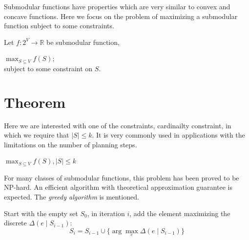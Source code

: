\documentclass[12pt]{article}
\begin{document}
Submodular functions have properties which are very similar to convex and concave functions. Here we focus on the problem of maximizing a submodular function subject to some constraints.

\begin{mydef}

Let $ f : 2^{V} \rightarrow \mathbb{R} $ be submodular function, 

\begin{center}
 $ \max_{S \subseteq V} f(S) $; \\
 subject to some constraint on $ S  $.

\end{center}
\end{mydef}


\section{Theorem}

Here we are interested with one of the constraints, cardinailty constraint, in which we require that $ | S | \leq k $. It is very commonly used in applications with the limitations on the number of planning steps.
\begin{mydef}
\begin{center}
$ \max_{S \subseteq V} f(S),  | S | \leq k $
\end{center}
\end{mydef}

For many classes of submodular functions, this problem has been proved to be NP-hard. An efficient algorithm with theoretical approximation guarantee is expected. The \emph{greedy algorithm} is mentioned.

\begin{mydef}
Start with the empty set $ S_{0} $,
in iteration $ i $,
add the element maximizing the discrete $ \Delta(e \mid S_{i-1}) $:
\begin{equation}
\label{eq:greedy}
S_{i} = S_{i-1} \cup \{ \arg \max_{e} \Delta(e \mid S_{i-1}) \}
\end{equation}

\end{mydef}
\end{document}
